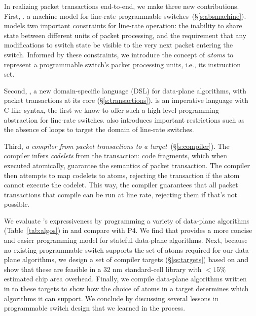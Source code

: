 In realizing packet transactions end-to-end, we make three new contributions.
First, {\em \absmachine}, a machine model for line-rate programmable
switches~\cite{rmt, xpliant, flexpipe}(\S\ref{s:absmachine}).  \absmachine
models two important constraints for line-rate operation: the inability to
share state between different units of packet processing, and the requirement
that any modifications to switch state be visible to the very next packet
entering the switch. Informed by these constraints, we introduce the concept of
{\em atoms} to represent a programmable switch's packet processing units, i.e.,
its instruction set.

Second, {\em \pktlanguage{}}, a new domain-specific language (DSL) for
data-plane algorithms, with packet transactions at its core
(\S\ref{s:transactions}).  \pktlanguage is an imperative language with C-like
syntax, the first we know to offer such a high level programming abstraction
for line-rate switches. \pktlanguage also introduces important restrictions
such as the absence of loops to target the domain of line-rate switches.

Third, {\em a compiler from \pktlanguage packet transactions to a \absmachine
target}~(\S\ref{s:compiler}). The \pktlanguage compiler infers {\em codelets}
from the transaction: code fragments, which when executed atomically, guarantee
the semantics of packet transaction. The compiler then attempts to map codelets
to atoms, rejecting the transaction if the atom cannot execute the codelet.
This way, the compiler guarantees that all packet transactions that compile can
be run at line rate, rejecting them if that's not possible.

We evaluate \pktlanguage's expressiveness by programming a variety of
data-plane algorithms (Table~\ref{tab:algos}) in \pktlanguage and compare with
P4. We find that \pktlanguage provides a more concise and easier programming
model for stateful data-plane algorithms.  Next, because no existing
programmable switch supports the set of atoms required for our data-plane
algorithms, we design a set of compiler targets (\S\ref{ss:targets}) based on
\absmachine and show that these are feasible in a 32 nm standard-cell library
with $< 15\%$ estimated chip area overhead. Finally, we compile data-plane
algorithms written in \pktlanguage to these targets to show how the choice of
atoms in a target determines which algorithms it can support. We conclude by
discussing several lessons in programmable switch design that we learned in the
process.
